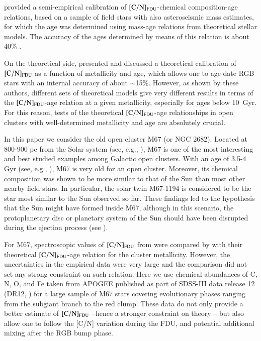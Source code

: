 \documentclass[a4paper,fleqn,usenatbib]{mnras}
\begin{document}
\citet{martig2016} provided a semi-empirical calibration of ${\rm [C/N]_{FDU}}$-chemical composition-age relations, based on a sample of field stars with also asteroseismic mass estimates, for which the age was determined using mass-age relations from theoretical stellar models. The accuracy of the ages determined by means of this relation is about 40\% \citep{martig2016}.
 
On the theoretical side, \citet{salaris2015} presented and discussed a theoretical calibration of ${\rm [C/N]_{FDU}}$ as a function of metallicity and age, which allows one to age-date RGB stars with an internal accuracy of about $\sim$15\%.
However, as shown by these authors, different sets of theoretical models give very different results in terms of the 
${\rm [C/N]_{FDU}}$-age relation at a given metallicity, especially for ages below 10~Gyr. 
For this reason, tests of the theoretical ${\rm [C/N]_{FDU}}$-age relationships in open clusters with well-determined metallicity 
and age are absolutely crucial. 

In this paper we consider the old open cluster M67 (or NGC 2682). Located at 800-900 pc from the Solar system (see, e.g., \citealt{sarajedini2009}), M67  is one of the most interesting and best studied examples among Galactic open clusters.  With an age of 3.5-4 Gyr (see, e.g., \citealt{sarajedini2009,bellini2010,kharchenko2013}), M67 is very old for an open cluster. Moreover, its chemical composition was shown to be more similar to that of the Sun than most other nearby field stars. In particular, the solar twin M67-1194 is considered to be the star most similar to the Sun observed so far. These findings led to the hypothesis that the Sun might have formed inside M67, although in this scenario, the protoplanetary disc or planetary system of the Sun should have been disrupted during the ejection process (see \citealt{pichardo2012}). 

For M67, spectroscopic values of ${\rm [C/N]_{FDU}}$ from \citet{gilroy1991} were compared by \citet{salaris2015} with their theoretical ${\rm [C/N]_{FDU}}$-age relation for the cluster metallicity. However, the uncertainties in the empirical data were very large and the comparison did not set any strong constraint on such relation.
Here we use chemical abundances of C, N, O, and Fe taken from APOGEE published as part of SDSS-III data release 12 (DR12, 
\citealt{alam2015}) for a large sample of M67 stars covering evolutionary phases ranging from the subgiant branch to the red clump. These data do not only provide a better estimate of ${\rm [C/N]_{FDU}}$ --hence a stronger constraint on theory -- but also allow one to follow the [C/N] variation during the FDU, and potential additional mixing after the RGB bump phase. 
\end{document}
